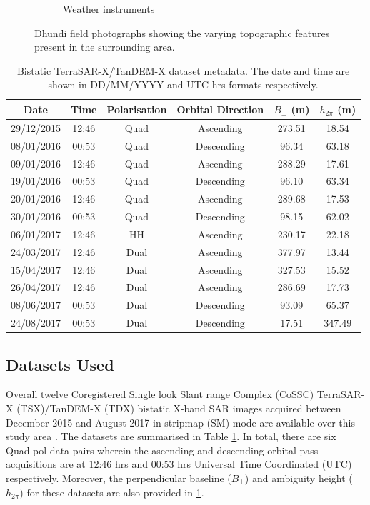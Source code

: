 \documentclass[12pt]{elsarticle}
\numberwithin{equation}{section}
\numberwithin{figure}{section}
\numberwithin{table}{section}
\begin{document}
\begin{figure}[!t]
\begin{subfigure}[t]{0.49\textwidth}
        \caption{Weather instruments}
        \label{subfig:stations}
    \end{subfigure}
    \caption{Dhundi field photographs showing the varying topographic features present in the surrounding area.}
    \label{fig:field}
\end{figure}

\begin{table}[!htbp]
\centering
\caption{Bistatic TerraSAR-X/TanDEM-X dataset metadata. The date and time are shown in DD/MM/YYYY and UTC hrs formats respectively.}
\label{table:data}
\begin{tabular}{c c c c c c}
\hline
\textbf{Date}    & \textbf{Time}   & \textbf{Polarisation}   & \textbf{Orbital Direction}    & \boldmath$B_\bot$ (m) & \boldmath$h_{2\pi}$ (m) \\ \hline
29/12/2015  & 12:46 & Quad  & Ascending & 273.51    & 18.54 \\ 
08/01/2016  & 00:53 & Quad  & Descending    & 96.34 & 63.18 \\ 
09/01/2016  & 12:46 & Quad  & Ascending & 288.29    & 17.61 \\ 
19/01/2016  & 00:53 & Quad  & Descending    & 96.10 & 63.34 \\ 
20/01/2016  & 12:46 & Quad  & Ascending & 289.68    & 17.53 \\ 
30/01/2016  & 00:53 & Quad  & Descending    & 98.15 & 62.02 \\ 
06/01/2017  & 12:46 & HH    & Ascending & 230.17    & 22.18 \\ 
24/03/2017  & 12:46 & Dual  & Ascending & 377.97    & 13.44 \\
15/04/2017  & 12:46 & Dual  & Ascending & 327.53    & 15.52 \\
26/04/2017  & 12:46 & Dual  & Ascending  & 286.69   & 17.73 \\
08/06/2017  & 00:53 & Dual  & Descending    & 93.09 & 65.37 \\
24/08/2017  & 00:53 & Dual  & Descending    & 17.51 & 347.49 \\ \hline
\end{tabular}
\end{table}

\subsection{Datasets Used}
\label{ssec:data}
Overall twelve Coregistered Single look Slant range Complex (CoSSC) TerraSAR-X (TSX)/TanDEM-X (TDX) bistatic X-band SAR images acquired between December 2015 and August 2017 in stripmap (SM) mode are available over this study area \citep{Balss2012}. The datasets are summarised in Table \ref{table:data}. In total, there are six Quad-pol data pairs wherein the ascending and descending orbital pass acquisitions are at 12:46 hrs and 00:53 hrs Universal Time Coordinated (UTC) respectively. Moreover, the perpendicular baseline ($B_\bot$) and ambiguity height ($h_{2\pi}$) for these datasets are also provided in \ref{table:data}. 
\end{document}
